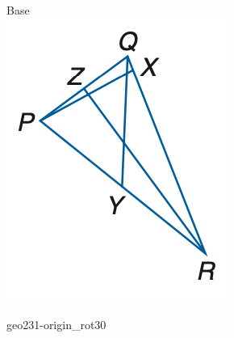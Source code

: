 \documentclass[12pt]{article}
\begin{document}
\begin{center}
\begin{minipage}{0.32\textwidth}\centering
Base\\
\includegraphics[width=0.95\linewidth]{out_rommath_origin/items/geo231-origin/assets/figure.png}
\end{minipage}
\hfill\begin{minipage}{0.32\textwidth}\centering
geo231-origin\_rot30\\

\end{minipage}
\end{center}
\end{document}
